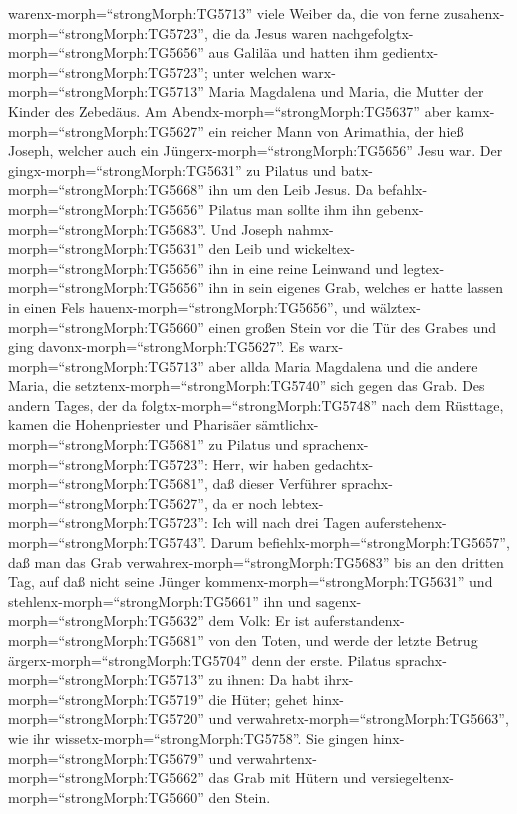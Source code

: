 warenx-morph=``strongMorph:TG5713'' viele Weiber da, die von ferne
zusahenx-morph=``strongMorph:TG5723'', die da Jesus waren
nachgefolgtx-morph=``strongMorph:TG5656'' aus Galiläa und hatten ihm
gedientx-morph=``strongMorph:TG5723'';  unter welchen
warx-morph=``strongMorph:TG5713'' Maria Magdalena und Maria, die Mutter
der Kinder des Zebedäus.  Am
Abendx-morph=``strongMorph:TG5637'' aber
kamx-morph=``strongMorph:TG5627'' ein reicher Mann von Arimathia, der
hieß Joseph, welcher auch ein Jüngerx-morph=``strongMorph:TG5656'' Jesu
war.  Der gingx-morph=``strongMorph:TG5631'' zu Pilatus und
batx-morph=``strongMorph:TG5668'' ihn um den Leib Jesus. Da
befahlx-morph=``strongMorph:TG5656'' Pilatus man sollte ihm ihn
gebenx-morph=``strongMorph:TG5683''.  Und Joseph
nahmx-morph=``strongMorph:TG5631'' den Leib und
wickeltex-morph=``strongMorph:TG5656'' ihn in eine reine Leinwand
 und legtex-morph=``strongMorph:TG5656'' ihn in sein
eigenes Grab, welches er hatte lassen in einen Fels
hauenx-morph=``strongMorph:TG5656'', und
wälztex-morph=``strongMorph:TG5660'' einen großen Stein vor die Tür des
Grabes und ging davonx-morph=``strongMorph:TG5627''.  Es
warx-morph=``strongMorph:TG5713'' aber allda Maria Magdalena und die
andere Maria, die setztenx-morph=``strongMorph:TG5740'' sich gegen das
Grab.  Des andern Tages, der da
folgtx-morph=``strongMorph:TG5748'' nach dem Rüsttage, kamen die
Hohenpriester und Pharisäer sämtlichx-morph=``strongMorph:TG5681'' zu
Pilatus  und sprachenx-morph=``strongMorph:TG5723'': Herr,
wir haben gedachtx-morph=``strongMorph:TG5681'', daß dieser Verführer
sprachx-morph=``strongMorph:TG5627'', da er noch
lebtex-morph=``strongMorph:TG5723'': Ich will nach drei Tagen
auferstehenx-morph=``strongMorph:TG5743''.  Darum
befiehlx-morph=``strongMorph:TG5657'', daß man das Grab
verwahrex-morph=``strongMorph:TG5683'' bis an den dritten Tag, auf daß
nicht seine Jünger kommenx-morph=``strongMorph:TG5631'' und
stehlenx-morph=``strongMorph:TG5661'' ihn und
sagenx-morph=``strongMorph:TG5632'' dem Volk: Er ist
auferstandenx-morph=``strongMorph:TG5681'' von den Toten, und werde der
letzte Betrug ärgerx-morph=``strongMorph:TG5704'' denn der erste.
 Pilatus sprachx-morph=``strongMorph:TG5713'' zu ihnen: Da
habt ihrx-morph=``strongMorph:TG5719'' die Hüter; gehet
hinx-morph=``strongMorph:TG5720'' und
verwahretx-morph=``strongMorph:TG5663'', wie ihr
wissetx-morph=``strongMorph:TG5758''.  Sie gingen
hinx-morph=``strongMorph:TG5679'' und
verwahrtenx-morph=``strongMorph:TG5662'' das Grab mit Hütern und
versiegeltenx-morph=``strongMorph:TG5660'' den Stein.

